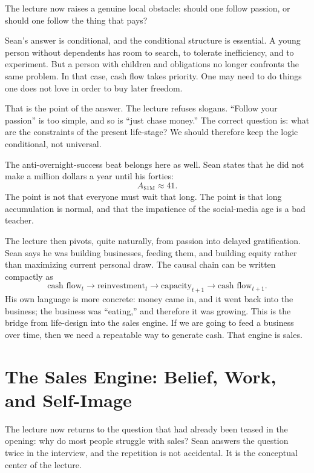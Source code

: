 The lecture now raises a genuine local obstacle: should one follow passion, or should one follow the thing that pays?

Sean's answer is conditional, and the conditional structure is essential. A young person without dependents has room to search, to tolerate inefficiency, and to experiment. But a person with children and obligations no longer confronts the same problem. In that case, cash flow takes priority. One may need to do things one does not love in order to buy later freedom.

That is the point of the answer. The lecture refuses slogans. ``Follow your passion'' is too simple, and so is ``just chase money.'' The correct question is: what are the constraints of the present life-stage? We should therefore keep the logic conditional, not universal.

The anti-overnight-success beat belongs here as well. Sean states that he did not make a million dollars a year until his forties:
\begin{equation}
A_{\$1\text{M}} \approx 41.
\end{equation}
The point is not that everyone must wait that long. The point is that long accumulation is normal, and that the impatience of the social-media age is a bad teacher.

The lecture then pivots, quite naturally, from passion into delayed gratification. Sean says he was building businesses, feeding them, and building equity rather than maximizing current personal draw. The causal chain can be written compactly as
\begin{equation}
\text{cash flow}_t \longrightarrow \text{reinvestment}_t \longrightarrow \text{capacity}_{t+1} \longrightarrow \text{cash flow}_{t+1}.
\end{equation}
His own language is more concrete: money came in, and it went back into the business; the business was ``eating,'' and therefore it was growing. This is the bridge from life-design into the sales engine. If we are going to feed a business over time, then we need a repeatable way to generate cash. That engine is sales.

\section{The Sales Engine: Belief, Work, and Self-Image}

The lecture now returns to the question that had already been teased in the opening: why do most people struggle with sales? Sean answers the question twice in the interview, and the repetition is not accidental. It is the conceptual center of the lecture.


